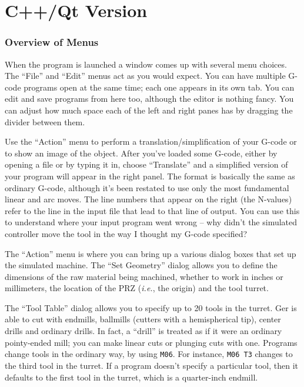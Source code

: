 \documentclass[titlepage,oneside,10pt]{article}
\begin{document}
\pagebreak



\part{C++/Qt Version}


\newcommand{\ignoretext}[1]{}

\section{Overview of Menus}

When the program is launched a window comes up with several menu
choices. The ``File'' and ``Edit'' menus act as you would expect. You
can have multiple G-code programs open at the same time; each one
appears in its own tab. You can edit and save programs from here too,
although the editor is nothing fancy. You can adjust how much space
each of the left and right panes has by dragging the divider between them.

Use the ``Action'' menu to perform a translation/simplification of
your G-code or to show an image of the object. After you've loaded
some G-code, either by opening a file or by typing it in, choose
``Translate'' and a simplified version of your program will appear in
the right panel. The format is basically the same as ordinary G-code,
although it's been restated to use only 
the most fundamental linear and arc moves. The line numbers that
appear on the right (the N-values) refer to the line in the input file
that lead to that line of output. You can use this to understand where
your input program went wrong -- why didn't the simulated controller
move the tool in the way I thought my G-code specified?

The ``Action'' menu is where you can bring up a various dialog boxes
that set up the simulated machine. The ``Set Geometry'' dialog allows
you to define the dimensions of the raw material being machined,
whether to work in inches or millimeters, the location of the PRZ
(\emph{i.e.}, the origin) and the tool turret. 

The ``Tool Table'' dialog allows you to specify up to 20 tools in the
turret. Ger is able to cut with endmills, ballmills (cutters with a
hemispherical tip), center drills and ordinary drills. In fact, a
``drill'' is treated as if it were an ordinary pointy-ended mill; you
can make linear cuts or plunging cuts with one. Programs change tools
in the ordinary way, by using {\tt M06}. For instance, {\tt M06 T3}
changes to the third tool in the turret. If a program doesn't specify
a particular tool, then it defaults to the first tool in the turret,
which is a quarter-inch endmill.
\end{document}
